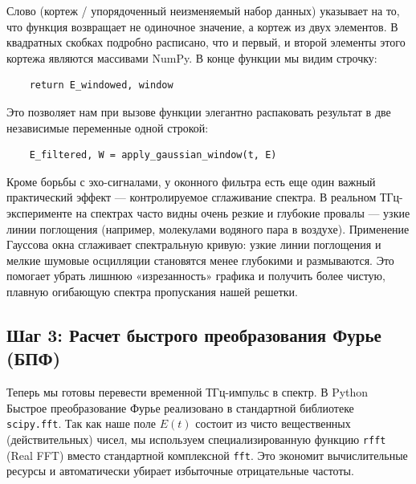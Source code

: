 \begin{syntaxdesc}
    \item[Множественный возврат (строка 7) \mycode{-> tuple[np.ndarray, np.ndarray]}] Слово  (кортеж / упорядоченный неизменяемый набор данных) указывает на то, что функция возвращает не одиночное значение, а кортеж из двух элементов. В квадратных скобках  подробно расписано, что и первый, и второй элементы этого кортежа являются массивами NumPy. В конце функции мы видим строчку:
    \begin{verbatim}
    return E_windowed, window
    \end{verbatim}
    Это позволяет нам при вызове функции элегантно распаковать результат в две независимые переменные одной строкой:
    \begin{verbatim}
    E_filtered, W = apply_gaussian_window(t, E)
    \end{verbatim}
\end{syntaxdesc}

Кроме борьбы с эхо-сигналами, у оконного фильтра есть еще один важный практический эффект — контролируемое сглаживание спектра. В реальном ТГц-эксперименте на спектрах часто видны очень резкие и глубокие провалы — узкие линии поглощения (например, молекулами водяного пара в воздухе). Применение Гауссова окна сглаживает спектральную кривую: узкие линии поглощения и мелкие шумовые осцилляции становятся менее глубокими и размываются. Это помогает убрать лишнюю «изрезанность» графика и получить более чистую, плавную огибающую спектра пропускания нашей решетки.


\subsection{Шаг 3: Расчет быстрого преобразования Фурье (БПФ)}

Теперь мы готовы перевести временной ТГц-импульс в спектр. В Python Быстрое преобразование Фурье реализовано в стандартной библиотеке \texttt{scipy.fft}. Так как наше поле $E(t)$ состоит из чисто вещественных (действительных) чисел, мы используем специализированную функцию \texttt{rfft} (Real FFT) вместо стандартной комплексной \texttt{fft}. Это экономит вычислительные ресурсы и автоматически убирает избыточные отрицательные частоты.

